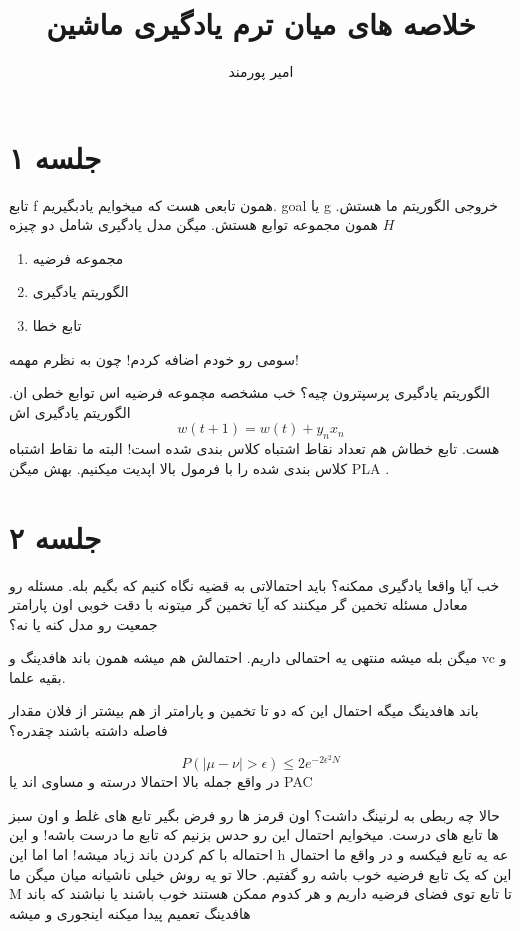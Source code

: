 \documentclass[twocolumn,11pt]{article}
\title{خلاصه های میان ترم یادگیری ماشین}
\author{امیر پورمند}
\begin{document}
\maketitle
\section{جلسه ۱}
تابع f همون تابعی هست که میخوایم یادبگیریم. 
goal یا g
خروجی الگوریتم ما هستش. 
$H$
همون مجموعه توابع هستش. میگن مدل یادگیری شامل دو چیزه
\begin{enumerate}
\item مجموعه فرضیه
\item الگوریتم یادگیری
\item تابع خطا
\end{enumerate}
سومی رو خودم اضافه کردم! چون به نظرم مهمه! 

الگوریتم یادگیری پرسپترون چیه؟
خب مشخصه مچموعه فرضیه اس توابع خطی ان. الگوریتم یادگیری اش
\begin{equation}
w(t+1) = w(t) + y_n x_n
\end{equation}
هست. تابع خطاش هم تعداد نقاط اشتباه کلاس بندی شده است! 
البته ما نقاط اشتباه کلاس بندی شده را با فرمول بالا اپدیت میکنیم. بهش میگن PLA . 

\section{جلسه ۲}
خب آیا واقعا یادگیری ممکنه؟
باید احتمالاتی به قضیه نگاه کنیم که بگیم بله. مسئله رو معادل مسئله تخمین گر میکنند که آیا تخمین گر میتونه با دقت خوبی اون پارامتر جمعیت رو مدل کنه یا نه؟

میگن بله میشه منتهی یه احتمالی داریم. احتمالش هم میشه همون باند هافدینگ و vc و بقیه علما. 

باند هافدینگ میگه احتمال این که دو تا تخمین و پارامتر از هم بیشتر از فلان مقدار فاصله داشته باشند چقدره؟

\begin{equation}
P(|\mu - \nu| > \epsilon) \leq 2 e^{-2 \epsilon^2 N}
\end{equation}
در واقع جمله بالا احتمالا درسته و مساوی اند
 یا 
PAC

حالا چه ربطی به لرنینگ داشت؟ اون قرمز ها رو فرض بگیر تابع های غلط و اون سبز ها تابع های درست. میخوایم احتمال این رو حدس بزنیم که تابع ما درست باشه! 
و این احتماله با کم کردن باند زیاد میشه! اما اما این h عه یه تابع فیکسه و در واقع ما احتمال این که یک تابع فرضیه خوب باشه رو گفتیم. حالا تو یه روش خیلی ناشیانه میان میگن ما M
تا تابع توی فضای فرضیه داریم و هر کدوم ممکن هستند خوب باشند یا نباشند که باند هافدینگ تعمیم پیدا میکنه اینجوری و میشه
\end{document}
